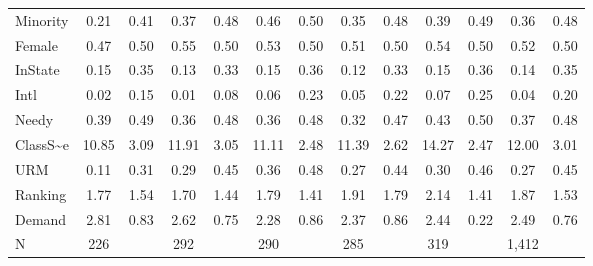 \begin{sidewaystable}[b]
\begin{tabular}{l|c|c|c|c|c|c|c|c|c|c|c|c}
            Minority                 & 0.21  & 0.41 & 0.37  & 0.48 & 0.46  & 0.50 & 0.35  & 0.48 & 0.39  & 0.49 & 0.36  & 0.48 \\
            Female                   & 0.47  & 0.50 & 0.55  & 0.50 & 0.53  & 0.50 & 0.51  & 0.50 & 0.54  & 0.50 & 0.52  & 0.50 \\
            InState                  & 0.15  & 0.35 & 0.13  & 0.33 & 0.15  & 0.36 & 0.12  & 0.33 & 0.15  & 0.36 & 0.14  & 0.35 \\
            Intl                     & 0.02  & 0.15 & 0.01  & 0.08 & 0.06  & 0.23 & 0.05  & 0.22 & 0.07  & 0.25 & 0.04  & 0.20 \\
            Needy                    & 0.39  & 0.49 & 0.36  & 0.48 & 0.36  & 0.48 & 0.32  & 0.47 & 0.43  & 0.50 & 0.37  & 0.48 \\
            ClassS{\textasciitilde}e & 10.85 & 3.09 & 11.91 & 3.05 & 11.11 & 2.48 & 11.39 & 2.62 & 14.27 & 2.47 & 12.00 & 3.01 \\
            URM                      & 0.11  & 0.31 & 0.29  & 0.45 & 0.36  & 0.48 & 0.27  & 0.44 & 0.30  & 0.46 & 0.27  & 0.45 \\
            Ranking                  & 1.77  & 1.54 & 1.70  & 1.44 & 1.79  & 1.41 & 1.91  & 1.79 & 2.14  & 1.41 & 1.87  & 1.53 \\
            Demand                   & 2.81  & 0.83 & 2.62  & 0.75 & 2.28  & 0.86 & 2.37  & 0.86 & 2.44  & 0.22 & 2.49  & 0.76 \\
\hline
            N                        & 226   &      & 292   &      & 290   &      & 285   &      & 319   &      & 1,412        \\
\hline
\hline
\end{tabular}
\end{sidewaystable}

\clearpage{}